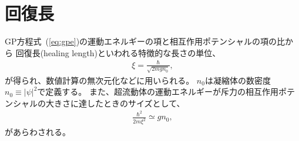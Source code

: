 \documentclass[12pt,a4paper]{jbook}
\begin{document}
        \section{回復長}
        GP方程式~(\ref{eq:gpe})の運動エネルギーの項と相互作用ポテンシャルの項の比から
        回復長(healing length)といわれる特徴的な長さの単位、
        \begin{eqnarray}
            \xi = \frac{\hbar}{\sqrt{2mgn_0}},
        \end{eqnarray}
        が得られ、数値計算の無次元化などに用いられる。
        $n_0$は凝縮体の数密度$n_0 \equiv |\psi|^2$で定義する。
        また、超流動体の運動エネルギーが斥力の相互作用ポテンシャルの大きさに達したときのサイズとして、
        \begin{eqnarray}
            \frac{\hbar^2}{2m \xi^2} \simeq g n_0,
        \end{eqnarray}
        があらわされる。
\end{document}
